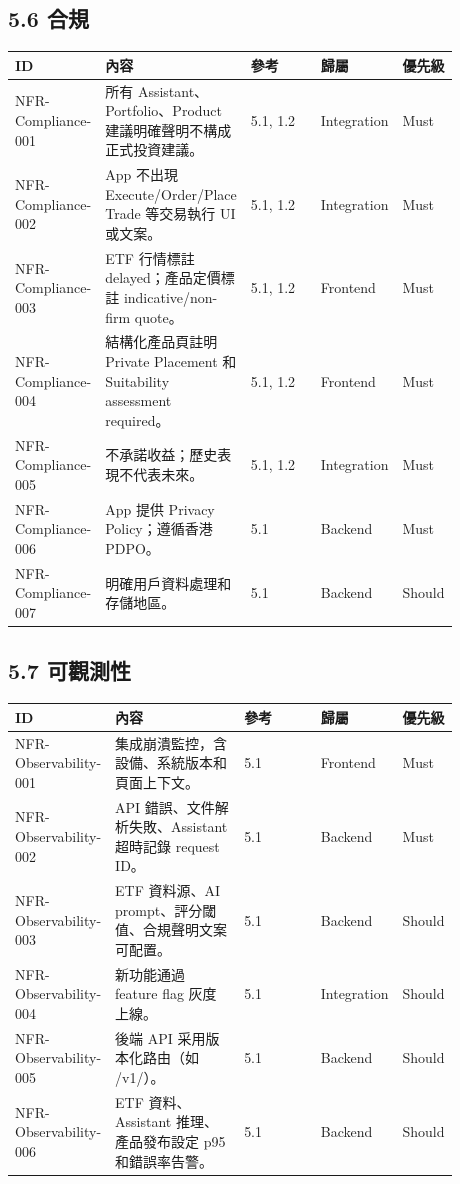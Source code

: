 \subsection{5.6 合規}

\begingroup
\small
\begin{longtable}{L{0.18\linewidth}L{0.30\linewidth}L{0.18\linewidth}L{0.12\linewidth}L{0.10\linewidth}}
\toprule
\textbf{ID} & \textbf{內容} & \textbf{參考} & \textbf{歸屬} & \textbf{優先級} \\
\midrule
NFR-Compliance-001 & 所有 Assistant、Portfolio、Product 建議明確聲明不構成正式投資建議。 & 5.1, 1.2 & Integration & Must \\
NFR-Compliance-002 & App 不出現 Execute/Order/Place Trade 等交易執行 UI 或文案。 & 5.1, 1.2 & Integration & Must \\
NFR-Compliance-003 & ETF 行情標註 delayed；產品定價標註 indicative/non-firm quote。 & 5.1, 1.2 & Frontend & Must \\
NFR-Compliance-004 & 結構化產品頁註明 Private Placement 和 Suitability assessment required。 & 5.1, 1.2 & Frontend & Must \\
NFR-Compliance-005 & 不承諾收益；歷史表現不代表未來。 & 5.1, 1.2 & Integration & Must \\
NFR-Compliance-006 & App 提供 Privacy Policy；遵循香港 PDPO。 & 5.1 & Backend & Must \\
NFR-Compliance-007 & 明確用戶資料處理和存儲地區。 & 5.1 & Backend & Should \\
\bottomrule
\end{longtable}
\endgroup

\subsection{5.7 可觀測性}

\begingroup
\small
\begin{longtable}{L{0.18\linewidth}L{0.30\linewidth}L{0.18\linewidth}L{0.12\linewidth}L{0.10\linewidth}}
\toprule
\textbf{ID} & \textbf{內容} & \textbf{參考} & \textbf{歸屬} & \textbf{優先級} \\
\midrule
NFR-Observability-001 & 集成崩潰監控，含設備、系統版本和頁面上下文。 & 5.1 & Frontend & Must \\
NFR-Observability-002 & API 錯誤、文件解析失敗、Assistant 超時記錄 request ID。 & 5.1 & Backend & Must \\
NFR-Observability-003 & ETF 資料源、AI prompt、評分閾值、合規聲明文案可配置。 & 5.1 & Backend & Should \\
NFR-Observability-004 & 新功能通過 feature flag 灰度上線。 & 5.1 & Integration & Should \\
NFR-Observability-005 & 後端 API 采用版本化路由（如 /v1/）。 & 5.1 & Backend & Should \\
NFR-Observability-006 & ETF 資料、Assistant 推理、產品發布設定 p95 和錯誤率告警。 & 5.1 & Backend & Should \\
\bottomrule
\end{longtable}
\endgroup
